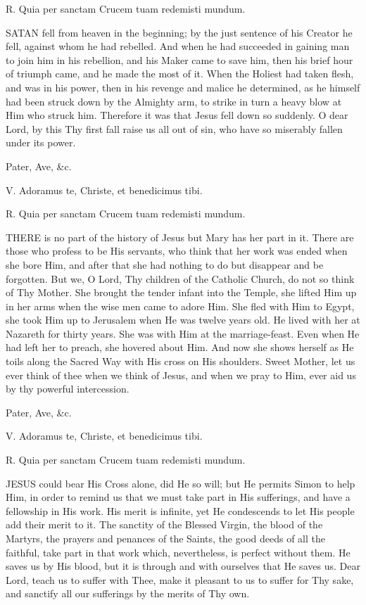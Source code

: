 R. Quia per sanctam Crucem tuam redemisti mundum.

SATAN fell from
heaven in the beginning; by the just sentence of his Creator he fell,
against whom he had rebelled. And when he had succeeded in gaining man
to join him in his rebellion, and his Maker came to save him, then his
brief hour of triumph came, and he made the most of it. When the Holiest
had taken flesh, and was in his power, then in his revenge and malice he
determined, as he himself had been struck down by the Almighty arm, to
strike in turn a heavy blow at Him who struck him. Therefore it was that
Jesus fell down so suddenly. O dear Lord, by this Thy first fall raise
us all out of sin, who have so miserably fallen under its power.

Pater, Ave, \&c.


V. Adoramus te, Christe, et
benedicimus tibi.

R. Quia per sanctam Crucem tuam redemisti mundum.

THERE is no part of
the history of Jesus but Mary has her part in it. There are those who
profess to be His servants, who think that her work was ended when she
bore Him, and after that she had nothing to do but disappear and be
forgotten. But we, O Lord, Thy children of the Catholic Church, do not
so think of Thy Mother. She brought the tender infant into the Temple,
she lifted Him up in her arms when the wise men came to adore Him. She
fled with Him to Egypt, she took Him up to Jerusalem when He was twelve
years old. He lived with her at Nazareth for thirty years. She was with
Him at the marriage-feast. Even when He had left her to preach, she
hovered about Him. And now she shows herself as He toils along the
Sacred Way with His cross on His shoulders. Sweet Mother, let us ever
think of thee when we think of Jesus, and when we pray to Him, ever aid
us by thy powerful intercession.

Pater, Ave, \&c.


V. Adoramus te, Christe, et
benedicimus tibi.

R. Quia per sanctam Crucem tuam redemisti mundum.

JESUS could bear His
Cross alone, did He so will; but He permits Simon to help Him, in order
to remind us that we must take part in His sufferings, and have a
fellowship in His work. His merit is infinite, yet He condescends to let
His people add their merit to it. The sanctity of the Blessed Virgin,
the blood of the Martyrs, the prayers and penances of the Saints, the
good deeds of all the faithful, take part in that work which,
nevertheless, is perfect without them. He saves us by His blood, but it
is through and with ourselves that He saves us. Dear Lord, teach us to
suffer with Thee, make it pleasant to us to suffer for Thy sake, and
sanctify all our sufferings by the merits of Thy own.

